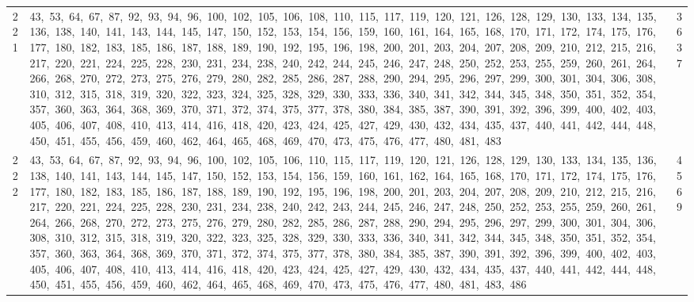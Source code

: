 \begin{longtable}{c|p{}|r}
221 & 43,\ 53,\ 64,\ 67,\ 87,\ 92,\ 93,\ 94,\ 96,\ 100,\ 102,\ 105,\ 106,\ 108,\ 110,\ 115,\ 117,\ 119,\ 120,\ 121,\ 126,\ 128,\ 129,\ 130,\ 133,\ 134,\ 135,\ 136,\ 138,\ 140,\ 141,\ 143,\ 144,\ 145,\ 147,\ 150,\ 152,\ 153,\ 154,\ 156,\ 159,\ 160,\ 161,\ 164,\ 165,\ 168,\ 170,\ 171,\ 172,\ 174,\ 175,\ 176,\ 177,\ 180,\ 182,\ 183,\ 185,\ 186,\ 187,\ 188,\ 189,\ 190,\ 192,\ 195,\ 196,\ 198,\ 200,\ 201,\ 203,\ 204,\ 207,\ 208,\ 209,\ 210,\ 212,\ 215,\ 216,\ 217,\ 220,\ 221,\ 224,\ 225,\ 228,\ 230,\ 231,\ 234,\ 238,\ 240,\ 242,\ 244,\ 245,\ 246,\ 247,\ 248,\ 250,\ 252,\ 253,\ 255,\ 259,\ 260,\ 261,\ 264,\ 266,\ 268,\ 270,\ 272,\ 273,\ 275,\ 276,\ 279,\ 280,\ 282,\ 285,\ 286,\ 287,\ 288,\ 290,\ 294,\ 295,\ 296,\ 297,\ 299,\ 300,\ 301,\ 304,\ 306,\ 308,\ 310,\ 312,\ 315,\ 318,\ 319,\ 320,\ 322,\ 323,\ 324,\ 325,\ 328,\ 329,\ 330,\ 333,\ 336,\ 340,\ 341,\ 342,\ 344,\ 345,\ 348,\ 350,\ 351,\ 352,\ 354,\ 357,\ 360,\ 363,\ 364,\ 368,\ 369,\ 370,\ 371,\ 372,\ 374,\ 375,\ 377,\ 378,\ 380,\ 384,\ 385,\ 387,\ 390,\ 391,\ 392,\ 396,\ 399,\ 400,\ 402,\ 403,\ 405,\ 406,\ 407,\ 408,\ 410,\ 413,\ 414,\ 416,\ 418,\ 420,\ 423,\ 424,\ 425,\ 427,\ 429,\ 430,\ 432,\ 434,\ 435,\ 437,\ 440,\ 441,\ 442,\ 444,\ 448,\ 450,\ 451,\ 455,\ 456,\ 459,\ 460,\ 462,\ 464,\ 465,\ 468,\ 469,\ 470,\ 473,\ 475,\ 476,\ 477,\ 480,\ 481,\ 483 & 3637 \\
222 & 43,\ 53,\ 64,\ 67,\ 87,\ 92,\ 93,\ 94,\ 96,\ 100,\ 102,\ 105,\ 106,\ 110,\ 115,\ 117,\ 119,\ 120,\ 121,\ 126,\ 128,\ 129,\ 130,\ 133,\ 134,\ 135,\ 136,\ 138,\ 140,\ 141,\ 143,\ 144,\ 145,\ 147,\ 150,\ 152,\ 153,\ 154,\ 156,\ 159,\ 160,\ 161,\ 162,\ 164,\ 165,\ 168,\ 170,\ 171,\ 172,\ 174,\ 175,\ 176,\ 177,\ 180,\ 182,\ 183,\ 185,\ 186,\ 187,\ 188,\ 189,\ 190,\ 192,\ 195,\ 196,\ 198,\ 200,\ 201,\ 203,\ 204,\ 207,\ 208,\ 209,\ 210,\ 212,\ 215,\ 216,\ 217,\ 220,\ 221,\ 224,\ 225,\ 228,\ 230,\ 231,\ 234,\ 238,\ 240,\ 242,\ 243,\ 244,\ 245,\ 246,\ 247,\ 248,\ 250,\ 252,\ 253,\ 255,\ 259,\ 260,\ 261,\ 264,\ 266,\ 268,\ 270,\ 272,\ 273,\ 275,\ 276,\ 279,\ 280,\ 282,\ 285,\ 286,\ 287,\ 288,\ 290,\ 294,\ 295,\ 296,\ 297,\ 299,\ 300,\ 301,\ 304,\ 306,\ 308,\ 310,\ 312,\ 315,\ 318,\ 319,\ 320,\ 322,\ 323,\ 325,\ 328,\ 329,\ 330,\ 333,\ 336,\ 340,\ 341,\ 342,\ 344,\ 345,\ 348,\ 350,\ 351,\ 352,\ 354,\ 357,\ 360,\ 363,\ 364,\ 368,\ 369,\ 370,\ 371,\ 372,\ 374,\ 375,\ 377,\ 378,\ 380,\ 384,\ 385,\ 387,\ 390,\ 391,\ 392,\ 396,\ 399,\ 400,\ 402,\ 403,\ 405,\ 406,\ 407,\ 408,\ 410,\ 413,\ 414,\ 416,\ 418,\ 420,\ 423,\ 424,\ 425,\ 427,\ 429,\ 430,\ 432,\ 434,\ 435,\ 437,\ 440,\ 441,\ 442,\ 444,\ 448,\ 450,\ 451,\ 455,\ 456,\ 459,\ 460,\ 462,\ 464,\ 465,\ 468,\ 469,\ 470,\ 473,\ 475,\ 476,\ 477,\ 480,\ 481,\ 483,\ 486 & 4569 \\

\end{longtable}
